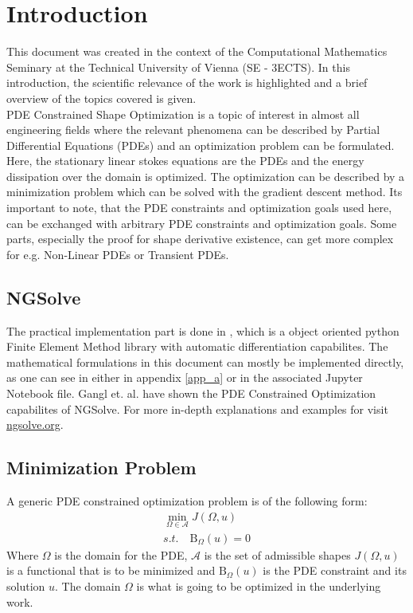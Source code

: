 \section{Introduction}

This document was created in the context of the Computational Mathematics Seminary
at the Technical University of Vienna (SE - 3ECTS). In this introduction, the scientific relevance
of the work is highlighted and a brief overview of the topics covered is given.\\

PDE Constrained Shape Optimization is a topic of interest in almost all engineering fields
where the relevant phenomena can be described by Partial Differential Equations (PDEs) and
an optimization problem can be formulated. Here, the stationary linear stokes equations are
the PDEs and the energy dissipation over the domain is optimized. The optimization can 
be described by a minimization problem which can be solved with the gradient descent method.
Its important to note, that the PDE constraints and optimization goals used here, 
can be exchanged with arbitrary PDE constraints and optimization goals. Some parts,
especially the proof for shape derivative existence, can get more complex for e.g. 
Non-Linear PDEs or Transient PDEs.\\

\subsection*{NGSolve}
The practical implementation part is done in , which is a object oriented python Finite Element
Method library with automatic differentiation capabilites. The mathematical formulations in this document 
can mostly be implemented directly, as one can see in either in appendix \ref{app_a} or in the associated
Jupyter Notebook file. Gangl et. al. \cite{fully_semi_paper_sturm} have shown the PDE Constrained 
Optimization capabilites of NGSolve. For more in-depth explanations and examples for 
visit \href{https://ngsolve.org/}{ngsolve.org}.

\subsection*{Minimization Problem}
A generic PDE constrained optimization problem is of the following form:
\begin{align*}
        \min_{ \Omega \in \mathcal{A} } J( \Omega, u) \\
        s.t. \quad \mathrm{B}_{\Omega}(u) = 0
\end{align*}
Where $\Omega$ is the domain for the PDE, $\mathcal{A}$ is the set of admissible shapes
$J(\Omega,u)$ is a functional that is to be minimized and $\mathrm{B}_{\Omega}(u)$ is the PDE
constraint and its solution $u$. The domain $\Omega$ is what is going to be 
optimized in the underlying work. \\

